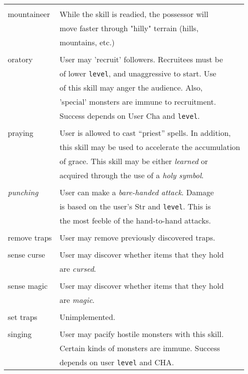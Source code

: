 \begin{longtable}{|p{4cm}|p{9cm}|}
 & \\
mountaineer	& While the skill is readied, the possessor will \\ 
		& move faster through "hilly" terrain (hills, \\ 
		& mountains, etc.) \\ 
 & \\
oratory		& User may 'recruit' followers. Recruitees must be \\ 
		& of lower {\tt level}, and unaggressive to start. Use \\ 
		& of this skill may anger the audience. Also, \\ 
		& 'special' monsters are immune to recruitment. \\ 
		& Success depends on User Cha and {\tt level}. \\ 
 & \\
praying		& User is allowed to cast ``priest'' spells. In addition, \\ 
		& this skill may be used to accelerate the accumulation \\ 
		& of grace. This skill may be either {\em learned} or \\ 
		& acquired through the use of a {\em holy symbol}. \\ 
 & \\
{\em punching}	& User can make a {\em bare-handed attack}. Damage \\ 
		& is based on the user's Str and {\tt level}. This is \\ 
		& the most feeble of the hand-to-hand attacks. \\ 
 & \\
remove traps 	& User may remove previously discovered traps. \\ 
 & \\
sense curse	& User may discover whether items that they hold \\ 
		& are {\em cursed}. \\
 & \\ 
sense magic	& User may discover whether items that they hold \\ 
		& are {\em magic}. \\
 & \\ 
set traps	& Unimplemented. \\ 
 & \\ 
singing		& User may pacify hostile monsters with this skill. \\ 
		& Certain kinds of monsters are immune. Success \\ 
		& depends on user {\tt level} and CHA. \\

\end{longtable}
